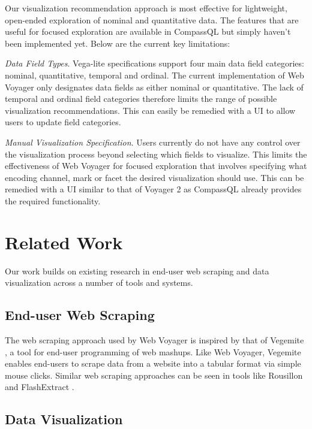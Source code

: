 \documentclass{vgtc}                          %
\begin{document}
Our visualization recommendation approach is most effective for
lightweight, open-ended exploration of nominal and quantitative data.
The features that are useful for focused exploration are available in
CompassQL but simply haven't been implemented yet. Below are the current
key limitations:

\emph{Data Field Types}. Vega-lite \cite{satyanarayan2017} specifications support four main data field categories: nominal,
quantitative, temporal and ordinal. The current implementation of Web
Voyager only designates data fields as either nominal or quantitative.
The lack of temporal and ordinal field categories therefore limits the
range of possible visualization recommendations. This can easily be
remedied with a UI to allow users to update field categories.

\emph{Manual Visualization Specification}. Users currently do not have any control over the visualization process
beyond selecting which fields to visualize. This limits the
effectiveness of Web Voyager for focused exploration that involves
specifying what encoding channel, mark or facet the desired
visualization should use. This can be remedied with a UI similar to that
of Voyager 2 \cite{wongsuphasawat2017} as CompassQL \cite{wongsuphasawat2016} already provides the required functionality.

\section{Related Work} \label{related-work}

Our work builds on existing research in end-user web scraping and data
visualization across a number of tools and systems.

\subsection{End-user Web Scraping}

The web scraping approach used by Web Voyager is inspired by that of
Vegemite \cite{lin2009}, a tool for end-user programming of web
mashups. Like Web Voyager, Vegemite enables end-users to scrape data
from a website into a tabular format via simple mouse clicks. Similar
web scraping approaches can be seen in tools like Rousillon
\cite{chasins2018} and FlashExtract \cite{le2014}.

\subsection{Data Visualization}
\end{document}
